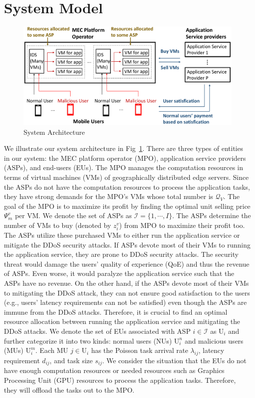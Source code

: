 \documentclass[conference]{IEEEtran}
\begin{document}
\section{System Model}
\begin{figure}[!ht] 
\centering
\includegraphics[width= \columnwidth]{5GDDoS_Game_system_architecture.pdf}
\caption{System Architecture}
\label{fig:system}
\end{figure}
We illustrate our system architecture in Fig~\ref{fig:system}. There are three types of entities in our system: the MEC platform operator (MPO), application service providers (ASPs), and end-users (EUs). The MPO manages the computation resources in terms of virtual machines (VMs) of geographically distributed edge servers. Since the ASPs do not have the computation resources to process the application tasks, they have strong demands for the MPO's VMs whose total number is $\mathcal{Q}_{V}$. The goal of the MPO is to maximize its profit by finding the optimal unit selling price $\Psi_{m}^v$ per VM. We denote the set of ASPs as $\mathcal{I}=\{1, \cdots, I\}$. The ASPs determine the number of VMs to buy (denoted by $z_i^v$) from MPO to maximize their profit too. The ASPs utilize these purchased VMs to either run the application service or mitigate the DDoS security attacks. If ASPs devote most of their VMs to running the application service, they are prone to DDoS security attacks. The security threat would damage the users' quality of experience (QoE) and thus the revenue of ASPs. Even worse, it would paralyze the application service such that the ASPs have no revenue. On the other hand, if the ASPs devote most of their VMs to mitigating the DDoS attack, they can not ensure good satisfaction to the users (e.g., users' latency requirements can not be satisfied) even though the ASPs are immune from the DDoS attacks. Therefore, it is crucial to find an optimal resource allocation between running the application service and mitigating the DDoS attacks. We denote the set of EUs associated with ASP $i \in \mathcal{I}$ as $\mathrm{U}_i$ and further categorize it into two kinds: normal users (NUs) $\mathrm{U}_i^n$ and malicious users (MUs) $\mathrm{U}_i^m$. Each MU $j \in \mathrm{U}_i$ has the Poisson task arrival rate $\lambda_{ij}$, latency requirement $d_{ij}$, and task size $s_{ij}$. We consider the situation that the EUs do not have enough computation resources or needed resources such as Graphics Processing Unit (GPU) resources to process the application tasks. Therefore, they will offload the tasks out to the MPO.  
\end{document}
